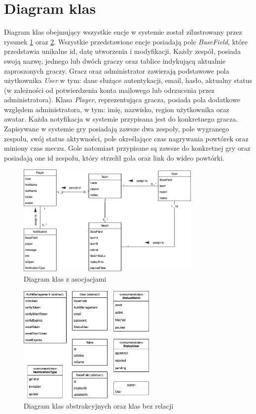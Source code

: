 \section{Diagram klas}
Diagram klas obejmujący wszystkie encje w systemie został zilustrowany przez rysunek \ref{fig:ClassDiagram} oraz \ref{fig:AbstractClassDiagram}. Wszystkie przedstawione encje posiadają pole \textit{BaseField}, które przedstawia unikalne id, datę utworzenia i modyfikacji. Każdy zespół, posiada swoją nazwę, jednego lub dwóch graczy oraz tablice indykującą aktualnie zaproszonych graczy. Gracz oraz administrator zawierają podstawowe pola użytkownika \textit{User} w tym: dane służące autentykacji, email, hasło, aktualny status (w zależności od potwierdzenia konta mailowego lub odrzucenia przez administratora). Klasa \textit{Player}, reprezentująca gracza, posiada pola dodatkowe względem administratora, w tym: imię, nazwisko, region użytkownika oraz awatar. Każda notyfikacja w systemie przypisana jest do konkretnego gracza. Zapisywane w systemie gry posiadają zawsze dwa zespoły, pole wygranego zespołu, swój status aktywności, pole określające czas nagrywania powtórek oraz miniony czas meczu. Gole natomiast przypisane są zawsze do konkretnej gry oraz posiadają one id zespołu, który strzelił gola oraz link do wideo powtórki.

\begin{figure}[h!]
    \centering
    \includegraphics[width=0.8\textwidth]{images/diagrams/class_diagram.png}
    \caption{Diagram klas z asocjacjami}
    \label{fig:ClassDiagram}
\end{figure}

\begin{figure}[h!]
    \centering
    \includegraphics[width=0.6\textwidth]{images/diagrams/class_diagram_rest.png}
    \caption{Diagram klas abstrakcyjnych oraz klas bez relacji}
    \label{fig:AbstractClassDiagram}
\end{figure}

